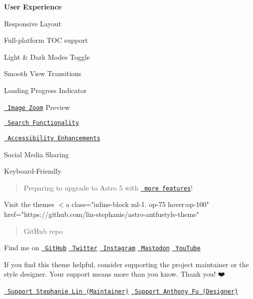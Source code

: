 {\bfseries{User Experience}}


\begin{DoxyItemize}
\item Responsive Layout
\item Full-\/platform TOC support
\item Light \& Dark Modes Toggle
\item Smooth View Transitions
\item Loading Progress Indicator
\item \href{./blog/faqs-and-known-issues/\#image-zoom}{\texttt{ Image Zoom}} Preview
\item \href{./blog/faqs-and-known-issues/\#search-functionality}{\texttt{ Search Functionality}}
\item \href{./blog/faqs-and-known-issues/\#about-seo-and-accessibility}{\texttt{ Accessibility Enhancements}}
\item Social Media Sharing
\item Keyboard-\/\+Friendly
\end{DoxyItemize}

\begin{quote}
Preparing to upgrade to Astro 5 with \href{https://github.com/users/lin-stephanie/projects/4}{\texttt{ more features}}! 🚀 \end{quote}




Visit the theme\textquotesingle{}s \texorpdfstring{$<$}{<}a class="{}inline-\/block ml-\/1. op-\/75 hover\+:op-\/100"{} href="{}https\+://github.\+com/lin-\/stephanie/astro-\/antfustyle-\/theme"{} \begin{quote}
 Git\+Hub repo 

\end{quote}


Find me on  \href{https://github.com/lin-stephanie/astro-antfustyle-theme}{\texttt{ Git\+Hub}} \href{https://github.com/lin-stephanie/astro-antfustyle-theme}{\texttt{ Twitter}} \href{https://github.com/lin-stephanie/astro-antfustyle-theme}{\texttt{ Instagram}} \href{https://github.com/lin-stephanie/astro-antfustyle-theme}{\texttt{ Mastodon}} \href{https://github.com/lin-stephanie/astro-antfustyle-theme}{\texttt{ You\+Tube}}  



If you find this theme helpful, consider supporting the project maintainer or the style designer. Your support means more than you know. Thank you! ❤️

 \href{https://github.com/sponsors/lin-stephanie}{\texttt{ Support Stephanie Lin (Maintainer)}} \href{https://github.com/sponsors/antfu}{\texttt{ Support Anthony Fu (Designer)}}  
